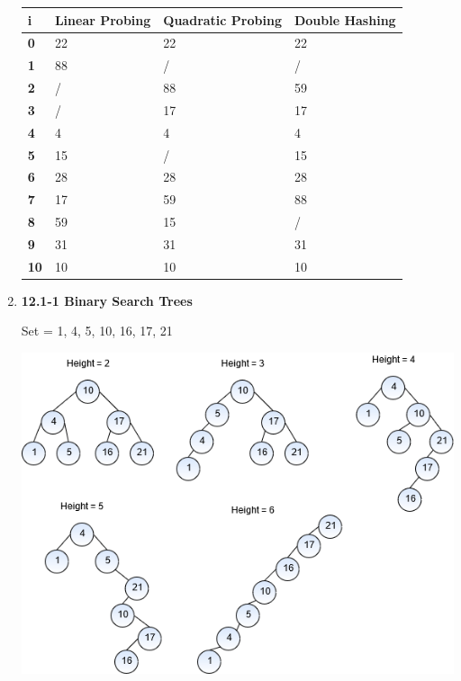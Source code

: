 \documentclass{article}
\begin{document}
\begin{enumerate}
    \begin{table}[H]
      \begin{tabular}{|l|l|l|l|}
      \hline
      \textbf{i}  & \textbf{Linear Probing} & \textbf{Quadratic Probing} & \textbf{Double Hashing} \\ \hline
      \textbf{0}  & 22                      & 22                         & 22                      \\ \hline
      \textbf{1}  & 88                      & /                          & /                       \\ \hline
      \textbf{2}  & /                       & 88                         & 59                      \\ \hline
      \textbf{3}  & /                       & 17                         & 17                      \\ \hline
      \textbf{4}  & 4                       & 4                          & 4                       \\ \hline
      \textbf{5}  & 15                      & /                          & 15                      \\ \hline
      \textbf{6}  & 28                      & 28                         & 28                      \\ \hline
      \textbf{7}  & 17                      & 59                         & 88                      \\ \hline
      \textbf{8}  & 59                      & 15                         & /                       \\ \hline
      \textbf{9}  & 31                      & 31                         & 31                      \\ \hline
      \textbf{10} & 10                      & 10                         & 10                      \\ \hline
      \end{tabular}
    \end{table}

    \item \textbf{12.1-1 Binary Search Trees}
    
    Set = {1, 4, 5, 10, 16, 17, 21}

    \includegraphics[width=\linewidth]{BTree.png}


\end{enumerate}
\end{document}
